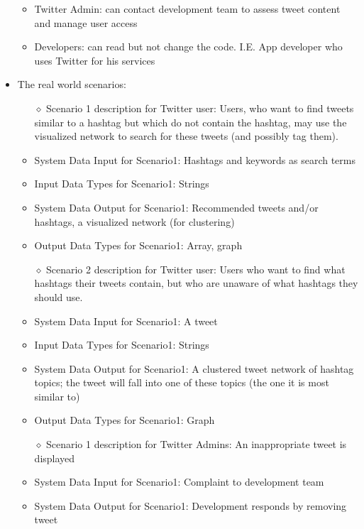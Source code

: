 \documentclass[10pt]{article}
\begin{document}
\begin{itemize}
\begin{itemize}
\item{Twitter Admin: can contact development team to assess tweet content and manage user access}

\item{Developers: can read but not change the code. I.E. App developer who uses Twitter for his services}

\end{itemize}
\item{The real world scenarios: }
	\begin{itemize} 
	\item[$\diamond$]{Scenario 1 description for Twitter user: }
	Users, who want to find tweets similar to a hashtag but which do not contain the hashtag, may use the visualized network to search for these tweets (and possibly tag them).
	\item{System Data Input for Scenario1: }
	Hashtags and keywords as search terms
	\item{Input Data Types for Scenario1: }
	Strings
	\item{System Data Output for Scenario1: }
	Recommended tweets and/or hashtags, a visualized network (for clustering)
	\item{Output Data Types for Scenario1: }
	Array, graph
	\end{itemize}

	\begin{itemize} 
	\item[$\diamond$]{Scenario 2 description for Twitter user: }
	Users who want to find what hashtags their tweets contain, but who are unaware of what hashtags they should use.
	\item{System Data Input for Scenario1: }
	A tweet
	\item{Input Data Types for Scenario1: }
	Strings
	\item{System Data Output for Scenario1: }
	A clustered tweet network of hashtag topics; the tweet will fall into one of these topics (the one it is most similar to)
	\item{Output Data Types for Scenario1: }
	Graph
	\end{itemize}

	\begin{itemize} 
	\item[$\diamond$]{Scenario 1 description for Twitter Admins: }
	An inappropriate tweet is displayed
	\item{System Data Input for Scenario1: }
	Complaint to development team
	\item{System Data Output for Scenario1: }
	Development responds by removing tweet
	\end{itemize}


\end{itemize}
\end{document}
